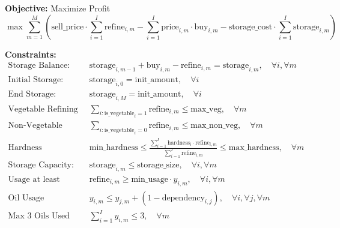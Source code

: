 \documentclass{article}
\begin{document}
\textbf{Objective:} Maximize Profit
\[
\max \sum_{m=1}^{M} \left( \text{sell\_price} \cdot \sum_{i=1}^{I} \text{refine}_{i,m} - \sum_{i=1}^{I} \text{price}_{i,m} \cdot \text{buy}_{i,m} - \text{storage\_cost} \cdot \sum_{i=1}^{I} \text{storage}_{i,m} \right)
\]

\textbf{Constraints:}
\begin{align*}
\text{Storage Balance:} \quad & \text{storage}_{i,m-1} + \text{buy}_{i,m} - \text{refine}_{i,m} = \text{storage}_{i,m}, \quad \forall i, \forall m \\
\text{Initial Storage:} \quad & \text{storage}_{i,0} = \text{init\_amount}, \quad \forall i \\
\text{End Storage:} \quad & \text{storage}_{i,M} = \text{init\_amount}, \quad \forall i \\
\text{Vegetable Refining Capacity:} \quad & \sum_{i: \text{is\_vegetable}_i = 1} \text{refine}_{i,m} \leq \text{max\_veg}, \quad \forall m \\
\text{Non-Vegetable Refining Capacity:} \quad & \sum_{i: \text{is\_vegetable}_i = 0} \text{refine}_{i,m} \leq \text{max\_non\_veg}, \quad \forall m \\
\text{Hardness Constraint:} \quad & \text{min\_hardness} \leq \frac{\sum_{i=1}^{I} \text{hardness}_i \cdot \text{refine}_{i,m}}{\sum_{i=1}^{I} \text{refine}_{i,m}} \leq \text{max\_hardness}, \quad \forall m \\
\text{Storage Capacity:} \quad & \text{storage}_{i,m} \leq \text{storage\_size}, \quad \forall i, \forall m \\
\text{Usage at least min\_usage:} \quad & \text{refine}_{i,m} \geq \text{min\_usage} \cdot y_{i,m}, \quad \forall i, \forall m \\
\text{Oil Usage Dependency:} \quad & y_{i,m} \leq y_{j,m} + (1 - \text{dependency}_{i,j}), \quad \forall i, \forall j, \forall m \\
\text{Max 3 Oils Used per Month:} \quad & \sum_{i=1}^{I} y_{i,m} \leq 3, \quad \forall m
\end{align*}
\end{document}
